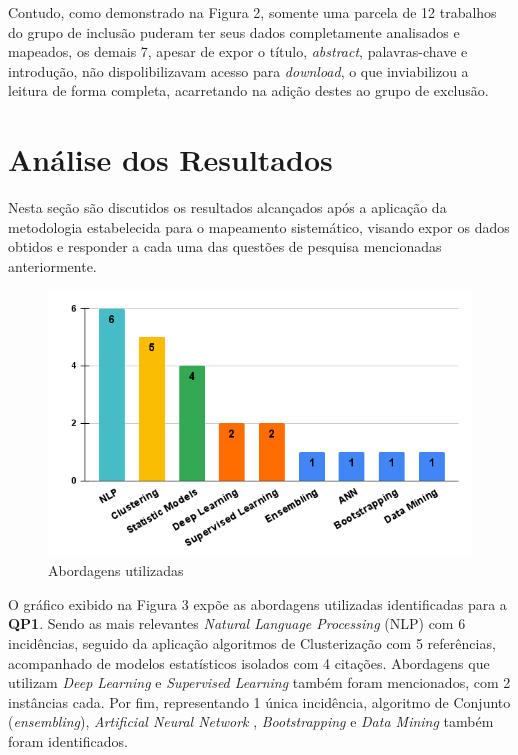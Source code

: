 \documentclass[conference]{IEEEtran}
\begin{document}
Contudo, como demonstrado na Figura 2, somente uma parcela de 12 trabalhos do grupo de inclusão puderam ter seus dados completamente analisados e mapeados, os demais 7, apesar de expor o título, \textit{abstract}, palavras-chave e introdução, não dispolibilizavam acesso para \textit{download}, o que inviabilizou a leitura de forma completa, acarretando na adição destes ao grupo de exclusão.

\section{Análise dos Resultados}
Nesta seção são discutidos os resultados alcançados após a aplicação da metodologia estabelecida para o mapeamento sistemático, visando expor os dados obtidos e responder a cada uma das questões de pesquisa mencionadas anteriormente.

\begin{figure}[h]
    \centering
    \includegraphics[scale=0.4]{images/abordagens-utilizadas.png}
    \caption{Abordagens utilizadas}
    \label{fig:abordagens-utilizadas}
\end{figure}

O gráfico exibido na Figura 3 expõe as abordagens utilizadas identificadas para a \textbf{QP1}. Sendo as mais relevantes \textit{Natural Language Processing} (NLP) \cite{ArtigoN3, ArtigoN2, ArtigoN4, ArtigoN6, ArtigoN9, ArtigoN10} com 6 incidências, seguido da aplicação algoritmos de Clusterização \cite{ArtigoN1, ArtigoN2, ArtigoN3, ArtigoN4, ArtigoN5} com 5 referências, acompanhado de modelos estatísticos isolados \cite{ArtigoN1, ArtigoN11} com 4 citações. Abordagens que utilizam \textit{Deep Learning} \cite{ArtigoN3} e \textit{Supervised Learning} \cite{ArtigoN1, ArtigoN2} também foram mencionados, com 2 instâncias cada. Por fim, representando 1 única incidência, algoritmo de Conjunto (\textit{ensembling}), \textit{Artificial Neural Network} \cite{ArtigoN8}, \textit{Bootstrapping} \cite{ArtigoN2} e \textit{Data Mining} \cite{ArtigoN8} também foram identificados.
\end{document}
